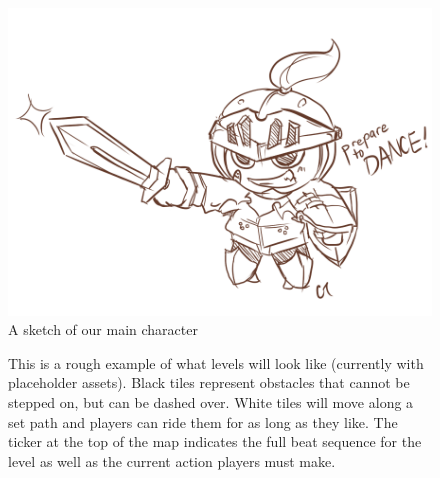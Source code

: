 \documentclass[]{article}
\begin{document}
\begin{figure}[!htb]
\begin{center}
\leavevmode
\includegraphics{img/main_char.jpg}
\end{center}
\caption{A sketch of our main character \label{logo}}
\end{figure}


\begin{figure}[!htb]
\begin{center}
\leavevmode
{}
\end{center}
\caption{ This is a rough example of what levels will look like
(currently with placeholder assets). Black tiles represent obstacles
that cannot be stepped on, but can be dashed over. White tiles will
move along a set path and players can ride them for as long as they
like. The ticker at the top of the map indicates the full beat
sequence for the level as well as the current action players must
make.\label{play_sketch}}
\end{figure}
\end{document}
